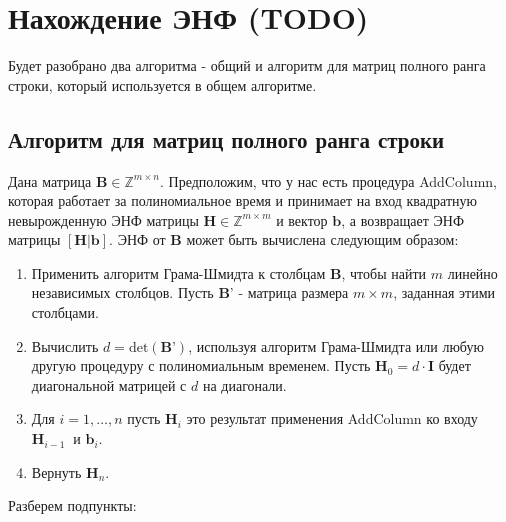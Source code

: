 \newpage

\section{Нахождение ЭНФ (TODO)}

Будет разобрано два алгоритма - общий и алгоритм для матриц полного ранга строки, который используется в общем алгоритме.

\subsection{Алгоритм для матриц полного ранга строки}

Дана матрица $ \mathbf{B} \in \mathbb{Z}^{m \times n} $. Предположим, что у нас есть процедура AddColumn, которая работает за полиномиальное время и принимает на вход квадратную невырожденную ЭНФ матрицы $ \mathbf{H} \in \mathbb{Z}^{m \times m} $ и вектор $ \mathbf{b} $, а возвращает ЭНФ матрицы $ [\mathbf{H|b}] $. ЭНФ от $ \mathbf{B} $ может быть вычислена следующим образом:
\begin{enumerate}
\item Применить алгоритм Грама-Шмидта к столбцам $ \mathbf{B} $, чтобы найти $ m $ линейно независимых столбцов. Пусть $ \mathbf{B}’ $ - матрица размера $ m \times m $, заданная этими столбцами.
\item Вычислить $ d=\mathrm{det}(\mathbf{B}’) $, используя алгоритм Грама-Шмидта или любую другую процедуру с полиномиальным временем. Пусть $ \mathbf{H}_0=d \cdot \mathbf{I} $ будет диагональной матрицей с $ d $ на диагонали.
\item Для $ i=1,\ldots,n $ пусть $ \mathbf{H}_i $ это результат применения AddColumn ко входу $  \mathbf{H}_{i-1}\ $ и $ \mathbf{b}_i $.
\item Вернуть $ \mathbf{H}_n $.
\end{enumerate}

Разберем подпункты:

